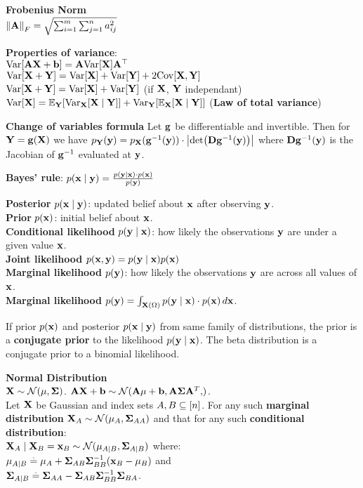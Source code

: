 \begin{framed}
    \textbf{Frobenius Norm}\\
    \(\norm{\mA}_F=\sqrt{\sum_{i=1}^{m}{\sum_{j=1}^{n}{a_{ij}^2}}}\)
\end{framed}
\begin{framed}
\textbf{Properties of variance}:\\
$\Var{\mA\rX + \vb} = \mA\Var{\rX}\transpose{\mA}$\\
$\Var{\rX + \rY} = \Var{\rX} + \Var{\rY} + 2 \Cov{\rX, \rY}$\\
$\Var{\rX + \rY} = \Var{\rX} + \Var{\rY}$ (if $\mathbf{X}$, $\mathbf{Y}$ independant)
$\Var{\rX} = \E[\rY]{\Var[\rX]{\rX \mid \rY}} + \Var[\rY]{\E[\rX]{\rX \mid \rY}}$ (\textbf{Law of total variance})
\end{framed}
\textbf{Change of variables formula}
Let $\mathbf{g}$ be differentiable and invertible. Then for $\mathbf{Y} = \mathbf{g}(\mathbf{X})$ we have $p_\rY(\vy) = p_\rX(\inv{\vg}(\vy)) \cdot \abs{\det{\jac \inv{\vg}(\vy)}}$ where $\mathbf{D} \mathbf{g}^{-1}(\mathbf{y})$ is the Jacobian of $\mathbf{g}^{-1}$ evaluated at $\mathbf{y}$.
\begin{framed}
\textbf{Bayes' rule}: 
$p(\mathbf{x} \mid \mathbf{y}) = \frac{p(\mathbf{y} \mid \mathbf{x}) \cdot p(\mathbf{x})}{p(\mathbf{y})}$
\end{framed}
\begin{framed}
    \textbf{Posterior} $p(\mathbf{x} \mid \mathbf{y})$: updated belief about $\mathbf{x}$ after observing $\mathbf{y}$. \\
    \textbf{Prior} $p(\mathbf{x})$: initial belief about $\mathbf{x}$. \\
    \textbf{Conditional likelihood} $p(\mathbf{y} \mid \mathbf{x})$: how likely the observations $\mathbf{y}$ are under a given value $\mathbf{x}$. \\
    \textbf{Joint likelihood} $p(\mathbf{x}, \mathbf{y}) = p(\mathbf{y} \mid \mathbf{x}) p(\mathbf{x})$ \\
    \textbf{Marginal likelihood} $p(\mathbf{y})$: how likely the observations $\mathbf{y}$ are across all values of $\mathbf{x}$. \\
    \textbf{Marginal likelihood} $p(\mathbf{y}) = \int_{\mathbf{X}(\Omega)} p(\mathbf{y} \mid \mathbf{x}) \cdot p(\mathbf{x}) \,d\mathbf{x}$. 
\end{framed}
If prior $p(\mathbf{x})$ and posterior $p(\mathbf{x} \mid \mathbf{y})$ from same family of distributions, the prior is a \textbf{conjugate prior} to the likelihood $p(\mathbf{y} \mid \mathbf{x})$. The beta distribution is a conjugate prior to a binomial likelihood. \\
\begin{framed}
    \textbf{Normal Distribution} \\
    $\rX\sim\N{\vmu}{\mSigma}$. $\mA\rX+\vb\sim\N{\mA\mu+\vb,\mA\mSigma \mA^T}$.\\
    Let $\mathbf{X}$ be Gaussian and index sets $A, B \subseteq [n]$.
    For any such \textbf{marginal distribution} $\rX_A \sim \N{\vmu_\sA}{\mSigma_{\sA\sA}}$ and that for any such \textbf{conditional distribution}: \\
    $ \rX_\sA \mid \rX_\sB = \vx_\sB \sim \N{\vmu_{\sA \mid \sB}}{\mSigma_{\sA \mid \sB}}$ where: \\
        $\mathbf{\mu}_{A \mid B} \overset{.}{=} \mathbf{\mu}_A + \mathbf{\Sigma}_{AB}\mathbf{\Sigma}_{BB}^{-1}(\mathbf{x}_B - \mathbf{\mu}_B)$ and \\
        $\mathbf{\Sigma}_{A \mid B} \overset{.}{=} \mathbf{\Sigma}_{AA} - \mathbf{\Sigma}_{AB}\mathbf{\Sigma}_{BB}^{-1}\mathbf{\Sigma}_{BA}$.
\end{framed}
